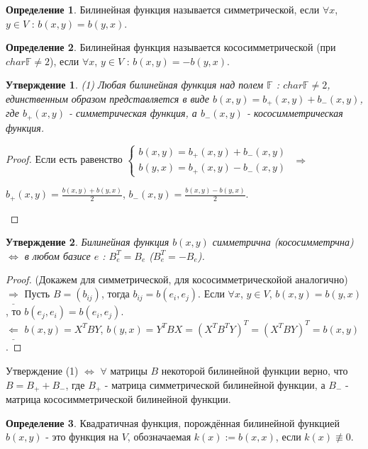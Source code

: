\documentclass[a4paper, 12pt]{article}
\newcommand{\F}{\mathbb F}
\theoremstyle{definition}
\newtheorem*{definition}{Определение}
\theoremstyle{plain}
\newtheorem*{subtheorem}{Утверждение}
\theoremstyle{remark}
\begin{document}
  \newpage
  \begin{definition}
    Билинейная функция называется симметрической, если $\forall x$, $y\in V$ : $b(x, y)=b(y,x)$.
  \end{definition}
  \begin{definition}
    Билинейная функция называется кососимметрической (при $char\F\neq2$), если $\forall x$, $y\in V$ : $b(x,y)= -b(y,x)$.
  \end{definition}
  \begin{subtheorem}(1)
    Любая билинейная функция над полем $\F$ : $char\F\neq2$, единственным образом представляется в виде $b(x,y) = b_+(x,y)+b_-(x,y)$, где $b_+(x,y)$ - симметрическая функция, а $b_-(x,y)$ - кососимметрическая функция. 
  \end{subtheorem}
  \begin{proof}
    Если есть равенство $\begin{cases}
      b(x,y) = b_+(x,y)+b_-(x,y)\\
      b(y,x) = b_+(x,y)-b_-(x,y)
    \end{cases}$ $\Longrightarrow$\\
    \begin{center}
      $b_+(x,y) = \frac{b(x,y)+b(y,x)}{2}$, $b_-(x,y) = \frac{b(x,y)-b(y,x)}{2}$.
    \end{center}
  \end{proof}
  \begin{subtheorem}
    Билинейная функция $b(x,y)$ симметрична (кососимметрчна)$\Longleftrightarrow$ в любом базисе $e$ : $B_e^T=B_e$ ($B_e^T=-B_e$).
  \end{subtheorem}
  \begin{proof} (Докажем для симметрической, для кососимметрическойой аналогично)
    $\underline{\Longrightarrow}$ Пусть $B = (b_{ij})$, тогда $b_{ij}=b(e_i, e_j)$. Если $\forall x$, $y\in V$, $b(x,y)= b(y,x)$, то $b(e_j, e_i) = b(e_i, e_j)$.\\
    $\underline{\Longleftarrow}$ $b(x,y)= X^TBY$, $b(y,x) = Y^TBX = (X^TB^TY)^T = (X^TBY)^T = b(x,y)$.
  \end{proof}
  Утверждение (1) $\Longleftrightarrow$ $\forall$ матрицы $B$ некоторой билинейной функции верно, что $B = B_++B_-$, где $B_+$ - матрица симметрической билинейной функции, а $B_-$ - матрица кососимметрической билинейной функции.
  \begin{definition}
    Квадратичная функция, порождённая билинейной функцией $b(x,y)$ - это функция на $V$, обозначаемая $k(x):=b(x,x)$, если $k(x)\not\equiv0$.
  \end{definition}
\end{document}
